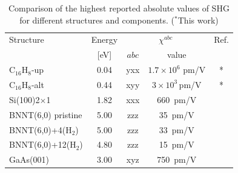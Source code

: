 \documentclass[pss]{wiley2sp} %
\begin{document}
\begin{table}[htb]%
\centering
\sidecaption
\begin{tabular}{lcccc}
\hline
\hline
Structure & \hspace{-5mm}Energy & \multicolumn{2}{c}{$\chi^{abc} $} &  Ref.\\
\cline{3-4} & \hspace{-5mm}[eV] & $abc$ & value \\
\hline
C$_{16}$H$_{8}$-up    &  0.04  & yxx   & $1.7\times10^{6}$ \scriptsize{pm/V}  & *     \\
C$_{16}$H$_{8}$-alt   &  0.44  & xyy   & $3\times10^{3}$\,\scriptsize{pm/V}  & *     \\
Si(100)2$\times$1     &  1.82  & xxx   & 660\, \scriptsize{pm/V}  & \cite{andersonPRB15}  \\
BNNT(6,0) pristine    &  5.00  & zzz   & 35\,  \scriptsize{pm/V}  & \cite{salazarPRB14} \\
BNNT(6,0)+4(H$_{2}$)  &  5.00  & zzz   & 33\,  \scriptsize{pm/V}  & \cite{salazarPRB14} \\
BNNT(6,0)+12(H$_{2}$) &  4.80  & zzz   & 15\,  \scriptsize{pm/V}  &
                                                                    \cite{salazarPRB14} \\
GaAs(001)     &  3.00  & xyz   & 750\, \scriptsize{pm/V}  & \cite{bergfeldPRL03}  \\
\hline
\hline
\end{tabular}
\caption[]{%
Comparison of the highest reported absolute values of SHG for 
different structures and components. ($^{*}$This work)}
\label{tab:shgcomp}
\end{table}
\end{document}
